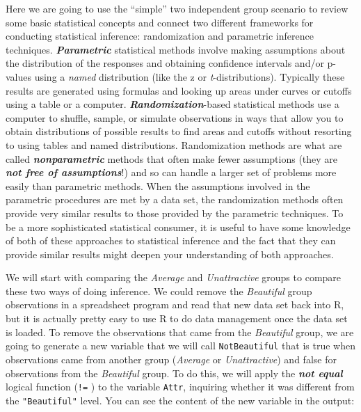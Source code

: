 \documentclass[]{book}
\newenvironment{Shaded}{\begin{snugshade}}{\end{snugshade}}
\newcommand{\StringTok}[1]{\textcolor[rgb]{0.31,0.60,0.02}{{#1}}}
\newcommand{\NormalTok}[1]{{#1}}
\begin{document}
Here we are going to use the ``simple'' two independent group scenario
to review some basic statistical concepts and connect two different
frameworks for conducting statistical inference: randomization and
parametric inference techniques. \textbf{\emph{Parametric}} statistical
methods involve making assumptions about the distribution of the
responses and obtaining confidence intervals and/or p-values using a
\emph{named} distribution (like the z or \emph{t}-distributions).
Typically these results are generated using formulas and looking up
areas under curves or cutoffs using a table or a computer.
\textbf{\emph{Randomization}}-based statistical methods use a computer
to shuffle, sample, or simulate observations in ways that allow you to
obtain distributions of possible results to find areas and cutoffs
without resorting to using tables and named distributions. Randomization
methods are what are called \textbf{\emph{nonparametric}} methods that
often make fewer assumptions (they are \textbf{\emph{not free of
assumptions}}!) and so can handle a larger set of problems more easily
than parametric methods. When the assumptions involved in the parametric
procedures are met by a data set, the randomization methods often
provide very similar results to those provided by the parametric
techniques. To be a more sophisticated statistical consumer, it is
useful to have some knowledge of both of these approaches to statistical
inference and the fact that they can provide similar results might
deepen your understanding of both approaches.

We will start with comparing the \emph{Average} and \emph{Unattractive}
groups to compare these two ways of doing inference. We could remove the
\emph{Beautiful} group observations in a spreadsheet program and read
that new data set back into R, but it is actually pretty easy to use R
to do data management once the data set is loaded. To remove the
observations that came from the \emph{Beautiful} group, we are going to
generate a new variable that we will call \texttt{NotBeautiful} that is
true when observations came from another group (\emph{Average} or
\emph{Unattractive}) and false for observations from the
\emph{Beautiful} group. To do this, we will apply the \textbf{\emph{not
equal}} logical function (\texttt{!=} ) to the variable \texttt{Attr},
inquiring whether it was different from the \texttt{"Beautiful"} level.
You can see the content of the new variable in the output:

\begin{Shaded}
\end{Shaded}
\end{document}
